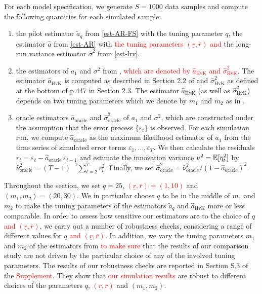 For each model specification, we generate $S=1000$ data samples and compute the following quantities for each simulated sample: 
\begin{enumerate}[label=(\roman*),leftmargin=0.9cm]
\item the pilot estimator $\widetilde{a}_q$ from \eqref{est-AR-FS} with the tuning parameter $q$, the estimator $\widehat{a}$ from \eqref{est-AR} with \textcolor{red}{the tuning parameters $(\underline{r},\overline{r})$ and} the long-run variance estimator $\widehat{\sigma}^2$ from \eqref{est-lrv}. 
\item the estimators of $a_1$ and $\sigma^2$ from \cite{Hall2003}, \textcolor{red}{which are denoted by $\widehat{a}_{\text{HvK}}$ and $\widehat{\sigma}^2_{\text{HvK}}$}. The estimator $\widehat{a}_{\text{HvK}}$ is computed as described in Section 2.2 of \cite{Hall2003} and $\widehat{\sigma}^2_{\text{HvK}}$ as defined at the bottom of p.447 in Section 2.3. The estimator $\widehat{a}_{\text{HvK}}$ (as well as $\widehat{\sigma}^2_{\text{HvK}}$) depends on two tuning parameters which we denote by $m_1$ and $m_2$ as in \cite{Hall2003}. 
\item oracle estimators $\widehat{a}_{\text{oracle}}$ and $\widehat{\sigma}^2_{\text{oracle}}$ of $a_1$ and $\sigma^2$, which are constructed under the assumption that the error process $\{\varepsilon_t\}$ is observed. For each simulation run, we compute $\widehat{a}_{\text{oracle}}$ as the maximum likelihood estimator of $a_1$ from the time series of simulated error terms $\varepsilon_1,\ldots,\varepsilon_T$. We then calculate the residuals $r_t = \varepsilon_t - \widehat{a}_{\text{oracle}} \, \varepsilon_{t-1}$ and estimate the innovation variance $\nu^2 = \mathbb{E}[\eta_t^2]$ by $\widehat{\nu}_{\text{oracle}}^2 = (T-1)^{-1} \sum_{t=2}^T r_t^2$. Finally, we set $\widehat{\sigma}^2_{\text{oracle}} = \widehat{\nu}_{\text{oracle}}^2 / (1 - \widehat{a}_{\text{oracle}})^2$. 
\end{enumerate}
Throughout the section, we set $q = 25$, \textcolor{red}{$(\underline{r},\overline{r}) = (1,10)$} and $(m_1,m_2) = (20,30)$. We in particular choose $q$ to be in the middle of $m_1$ and $m_2$ to make the tuning parameters of the estimators $\widetilde{a}_q$ and $\widehat{a}_{\text{HvK}}$ more or less comparable. In order to assess how sensitive our estimators are to the choice of $q$ \textcolor{red}{ and $(\underline{r}, \overline{r})$}, we carry out a number of robustness checks, considering a range of different values for $q$ \textcolor{red}{and $(\underline{r},\overline{r})$}. In addition, we vary the tuning parameters $m_1$ and $m_2$ of the estimators from \cite{Hall2003} \textcolor{red}{to make sure} that the results of our comparison study are not driven by the particular choice of any of the involved tuning parameters. The results of our robustness checks are reported in Section S.3 of the \textcolor{red}{Supplement}. They show that \textcolor{red}{our simulation results} are robust to %
different choices of the parameters $q$, \textcolor{red}{$(\underline{r},\overline{r})$} and $(m_1,m_2)$. %


